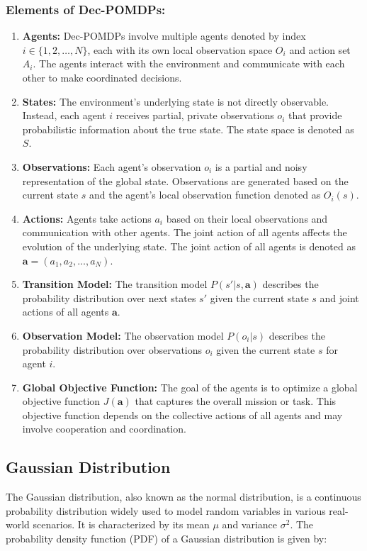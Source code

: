 \subsubsection*{Elements of Dec-POMDPs:}
\begin{enumerate}
    \item \textbf{Agents:} Dec-POMDPs involve multiple agents denoted by index $i \in \{1, 2, \ldots, N\}$, each with its own local observation space $O_i$ and action set $A_i$. The agents interact with the environment and communicate with each other to make coordinated decisions.
    \item \textbf{States:} The environment's underlying state is not directly observable. Instead, each agent $i$ receives partial, private observations $o_i$ that provide probabilistic information about the true state. The state space is denoted as $S$.
    \item \textbf{Observations:} Each agent's observation $o_i$ is a partial and noisy representation of the global state. Observations are generated based on the current state $s$ and the agent's local observation function denoted as $O_i(s)$.
    \item \textbf{Actions:} Agents take actions $a_i$ based on their local observations and communication with other agents. The joint action of all agents affects the evolution of the underlying state. The joint action of all agents is denoted as $\mathbf{a} = (a_1, a_2, \ldots, a_N)$.
    \item \textbf{Transition Model:} The transition model $P(s' | s, \mathbf{a})$ describes the probability distribution over next states $s'$ given the current state $s$ and joint actions of all agents $\mathbf{a}$.
    \item \textbf{Observation Model:} The observation model $P(o_i | s)$ describes the probability distribution over observations $o_i$ given the current state $s$ for agent $i$.
    \item \textbf{Global Objective Function:} The goal of the agents is to optimize a global objective function $J(\mathbf{a})$ that captures the overall mission or task. This objective function depends on the collective actions of all agents and may involve cooperation and coordination.

\end{enumerate}
\subsection{Gaussian Distribution}\label{subsec:gaussian-distribution}
The Gaussian distribution, also known as the normal distribution, is a continuous probability distribution widely used to model random variables in various real-world scenarios. It is characterized by its mean $\mu$ and variance $\sigma^2$. The probability density function (PDF) of a Gaussian distribution is given by:

